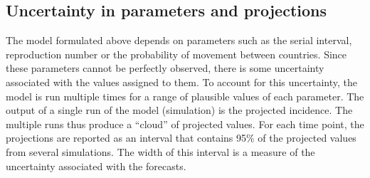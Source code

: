 \documentclass[a4paper,12pt]{article}
\begin{document}
\subsection*{Uncertainty in parameters and projections}

The model formulated above depends on parameters such as the serial
interval, reproduction number or the probability of movement between countries. Since these
parameters cannot be perfectly observed, there is some uncertainty
associated with the values assigned to them. To account for this
uncertainty, the model is run multiple times for a range of plausible values of each
parameter. The output of a single run of the model (simulation) is the
projected incidence. The multiple runs thus produce a ``cloud'' of
projected values. For each time point, the projections are reported as an interval
that contains 95\% of the projected values from several
simulations. The width of this interval is a measure of the uncertainty
associated with the forecasts.
\end{document}
